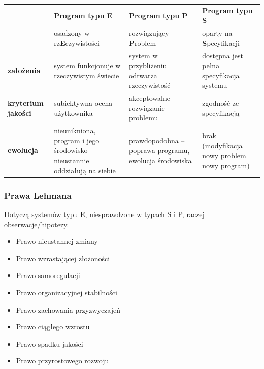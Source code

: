 \documentclass[a4paper]{article}
\begin{document}
    \begin{table}[H]
        \begin{center}
            \begin{tabular}{ p{2cm} | p{4cm} | p{4cm} | p{4cm}}
                & \textbf{Program typu E} & \textbf{Program typu P} & \textbf{Program typu S}\\
                & osadzony w rz\textbf{E}czywistości & rozwiązujący \textbf{P}roblem & oparty na \textbf{S}pecyfikacji\\
                \toprule
                \textbf{założenia} & system funkcjonuje w rzeczywistym świecie
                & system w przybliżeniu odtwarza rzeczywistość
                & dostępna jest pełna specyfikacja systemu
                \\

                \cmidrule(r){2-2}\cmidrule(rl){3-3}\cmidrule(l){4-4}

                \textbf{kryterium jakości} & subiektywna ocena użytkownika
                & akceptowalne rozwiązanie problemu
                & zgodność ze specyfikacją
                \\

                \cmidrule(r){2-2}\cmidrule(rl){3-3}\cmidrule(l){4-4}
                \textbf{ewolucja} & nieunikniona, program i jego środowisko nieustannie oddziałują na siebie
                &
                prawdopodobna – poprawa programu, ewolucja środowiska
                &
                brak (modyfikacja nowy problem nowy program)
                \\
            \end{tabular}
        \end{center}
    \end{table}

    \subsubsection{Prawa Lehmana}
    Dotyczą systemów typu E, niesprawdzone w typach S i P, raczej obserwacje/hipotezy.

    \begin{itemize}
        \item Prawo nieustannej zmiany
        \item Prawo wzrastającej złożoności
        \item Prawo samoregulacji
        \item Prawo organizacyjnej stabilności
        \item Prawo zachowania przyzwyczajeń
        \item Prawo ciągłego wzrostu
        \item Prawo spadku jakości
        \item Prawo przyrostowego rozwoju
    \end{itemize}
\end{document}
